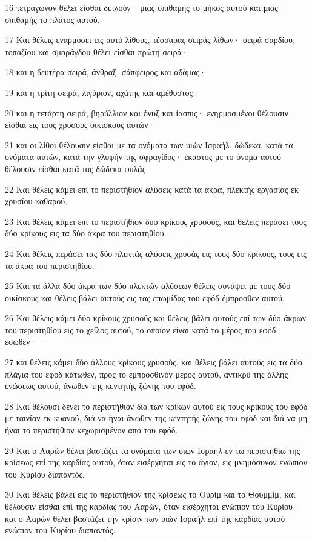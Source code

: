 \par 16 τετράγωνον θέλει είσθαι διπλούν· μιας σπιθαμής το μήκος αυτού και μιας σπιθαμής το πλάτος αυτού.
\par 17 Και θέλεις εναρμόσει εις αυτό λίθους, τέσσαρας σειράς λίθων· σειρά σαρδίου, τοπαζίου και σμαράγδου θέλει είσθαι πρώτη σειρά·
\par 18 και η δευτέρα σειρά, άνθραξ, σάπφειρος και αδάμας·
\par 19 και η τρίτη σειρά, λιγύριον, αχάτης και αμέθυστος·
\par 20 και η τετάρτη σειρά, βηρύλλιον και όνυξ και ίασπις· ενηρμοσμένοι θέλουσιν είσθαι εις τους χρυσούς οικίσκους αυτών·
\par 21 και οι λίθοι θέλουσιν είσθαι με τα ονόματα των υιών Ισραήλ, δώδεκα, κατά τα ονόματα αυτών, κατά την γλυφήν της σφραγίδος· έκαστος με το όνομα αυτού θέλουσιν είσθαι κατά τας δώδεκα φυλάς
\par 22 Και θέλεις κάμει επί το περιστήθιον αλύσεις κατά τα άκρα, πλεκτής εργασίας εκ χρυσίου καθαρού.
\par 23 Και θέλεις κάμει επί το περιστήθιον δύο κρίκους χρυσούς, και θέλεις περάσει τους δύο κρίκους εις τα δύο άκρα του περιστηθίου.
\par 24 Και θέλεις περάσει τας δύο πλεκτάς αλύσεις χρυσάς εις τους δύο κρίκους, τους εις τα άκρα του περιστηθίου.
\par 25 Και τα άλλα δύο άκρα των δύο πλεκτών αλύσεων θέλεις συνάψει με τους δύο οικίσκους και θέλεις βάλει αυτούς εις τας επωμίδας του εφόδ έμπροσθεν αυτού.
\par 26 Και θέλεις κάμει δύο κρίκους χρυσούς και θέλεις βάλει αυτούς επί των δύο άκρων του περιστηθίου εις το χείλος αυτού, το οποίον είναι κατά το μέρος του εφόδ έσωθεν·
\par 27 και θέλεις κάμει δύο άλλους κρίκους χρυσούς, και θέλεις βάλει αυτούς εις τα δύο πλάγια του εφόδ κάτωθεν, προς το εμπροσθινόν μέρος αυτού, αντικρύ της άλλης ενώσεως αυτού, άνωθεν της κεντητής ζώνης του εφόδ.
\par 28 Και θέλουσι δένει το περιστήθιον διά των κρίκων αυτού εις τους κρίκους του εφόδ με ταινίαν εκ κυανού, διά να ήναι άνωθεν της κεντητής ζώνης του εφόδ και διά να μη ήναι το περιστήθιον κεχωρισμένον από του εφόδ.
\par 29 Και ο Ααρών θέλει βαστάζει τα ονόματα των υιών Ισραήλ εν τω περιστηθίω της κρίσεως επί της καρδίας αυτού, όταν εισέρχηται εις το άγιον, εις μνημόσυνον ενώπιον του Κυρίου διαπαντός.
\par 30 Και θέλεις βάλει εις το περιστήθιον της κρίσεως το Ουρίμ και το Θουμμίμ, και θέλουσιν είσθαι επί της καρδίας του Ααρών, όταν εισέρχηται ενώπιον του Κυρίου· και ο Ααρών θέλει βαστάζει την κρίσιν των υιών Ισραήλ επί της καρδίας αυτού ενώπιον του Κυρίου διαπαντός.
